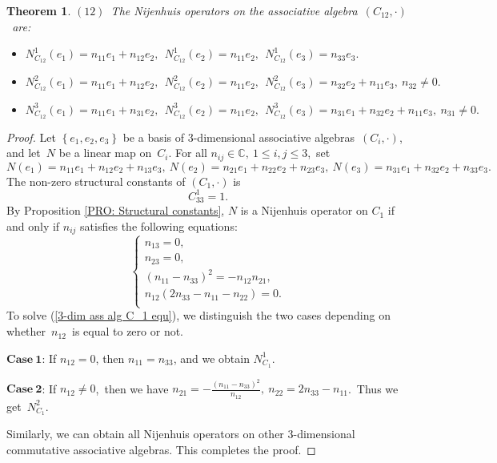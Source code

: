 \documentclass[12pt, reqno]{amsart}
\theoremstyle{plain}
\newtheorem{theorem}{Theorem}[section]
\def \n  {\mathfrak{n}}
\begin{document}
\begin{theorem}
$(12)$~The Nijenhuis operators on the associative algebra~$(C_{12},\cdot)$~are:
\begin{itemize}
    \item[]  $N_{C_{12}}^1(e_1)=n_{11}e_1+n_{12}e_2 ,
   ~~ N_{C_{12}}^1(e_2)=  n_{11}e_2,~~
   N_{C_{12}}^1(e_3)=  n_{33}e_3.$
   \item[]  $N_{C_{12}}^2(e_1)=n_{11}e_1+n_{12}e_2  ,
   ~~ N_{C_{12}}^2(e_2)=  n_{11}e_2,~~
   N_{C_{12}}^2(e_3)=n_{32}e_2+  n_{11}e_3,~n_{32}\neq0.$
    \item[]  $N_{C_{12}}^3(e_1)=n_{11}e_1+n_{31}e_2 ,
   ~~ N_{C_{12}}^3(e_2)=  n_{11}e_2,~~
   N_{C_{12}}^3(e_3)=n_{31}e_1+n_{32}e_2+  n_{11}e_3,~n_{31}\neq0.$
   \end{itemize}
\end{theorem}
\begin{proof}
Let $\left\{e_{1},  e_{2}, e_{3}\right\}$ be a basis of 3-dimensional associative algebras~$(C_{i},\cdot)$, and let~$N$ be a linear map on~$C_{i}$. For all $n_{ij}\in
 \mathbb{C},~1\leqslant i,j\leqslant3$,~set
  \begin{equation*}
    N(e_{1})=n_{11}e_1+n_{12}e_2+n_{13}e_3,
    ~N(e_{2})=n_{21}e_1+n_{22}e_2+n_{23}e_3,
    ~N(e_{3})=n_{31}e_1+n_{32}e_2+n_{33}e_3.
  \end{equation*}
The non-zero structural constants of $(C_{1},\cdot)$ is
\begin{equation*}
   C_{3 3}^{1}=1.
\end{equation*}
By Proposition \ref{PRO: Structural constants}, $N$ is a Nijenhuis operator  on $C_{1}$ if and only if $n_{i j} $ satisfies the following equations:
\begin{equation}\label{3-dim ass alg C_1 equ}
  \left\{\begin{array}{l}
n_{13}=0,\\n_{23}=0,\\
({n_{11}}-n_{33})^2=-n_{12}n_{21},\\
n_{12}(2n_{33}-n_{11}-n_{22})=0.\\
\end{array}\right.
\end{equation}
To solve (\ref{3-dim ass alg C_1 equ}), we distinguish
the two cases depending on whether~$n_{12}$~is equal to zero or not.

$\mathbf{Case~1}$: If $n_{12} = 0$, then $n_{11} = n_{33}$, and we obtain $N_{C_{1}}^1$.


$\mathbf{Case~2}$: If $n_{12}\neq0$,~then we have $n_{21}=-\frac{(n_{11}-n_{33})^2}{n_{12}},~n_{22}=2n_{33}-n_{11}$.~Thus we get~$N_{C_{1}}^2$.

Similarly, we can obtain all Nijenhuis operators on other 3-dimensional  commutative associative algebras. This completes the proof.
\end{proof}
\end{document}
